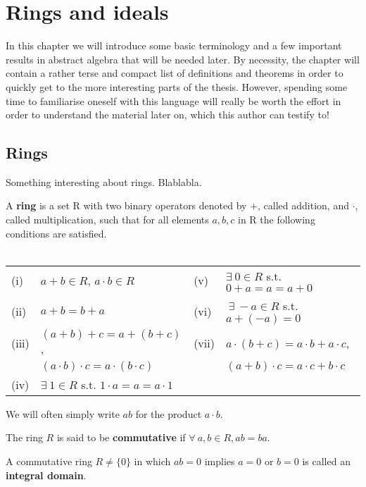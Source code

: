\documentclass[english,bachelor]{liumaiex}
\begin{document}
\chapter{Rings and ideals}
In this chapter we will introduce some basic terminology and a few important results in abstract algebra that will be needed later. By necessity, the chapter will contain a rather terse and compact list of definitions and theorems in order to quickly get to the more interesting parts of the thesis. However, spending some time to familiarise oneself with this language will really be worth the effort in order to understand the material later on, which this author can testify to!

\section{Rings}
Something interesting about rings. Blablabla.
\begin{define}
A \textbf{ring} is a set R with two binary operators denoted by $+$, called addition, and $\cdot$, called multiplication, such that for all elements $a, b, c$ in R the following conditions are satisfied.\\ \\
\begin{tabular}{lllp{5cm}}
(i) & $a+b \in R$, $a\cdot b \in R$ & (v) & $\exists \ 0 \in R$ s.t. $0+a = a = a+0$\\
(ii) & $a+b = b+a$ & (vi) & $ \ \exists \ -a\in R$ s.t. $a+(-a)=0$\\
(iii) & $(a+b)+c = a+(b+c)$,  & (vii) & $a \cdot (b+c) = a \cdot b + a \cdot c$, \\
& $(a\cdot b)\cdot c = a\cdot (b \cdot c)$ & &$(a+b) \cdot c = a \cdot c + b \cdot c$\\
(iv) &  $\exists \ 1\in R$ s.t. $1\cdot a = a = a\cdot 1$ & & \\
\end{tabular}
\end{define}

\begin{rem}
We will often simply write $ab$ for the product $a \cdot b$.
\end{rem}

\begin{define}
The ring $R$ is said to be \textbf{commutative} if $\forall \ a,b \in R, ab = ba$.
\end{define}

\begin{define}
A commutative ring $R\neq \{0\}$ in which $ab = 0$ implies $a=0$ or $b=0$ is called an \textbf{integral domain}.
\end{define}
\end{document}

